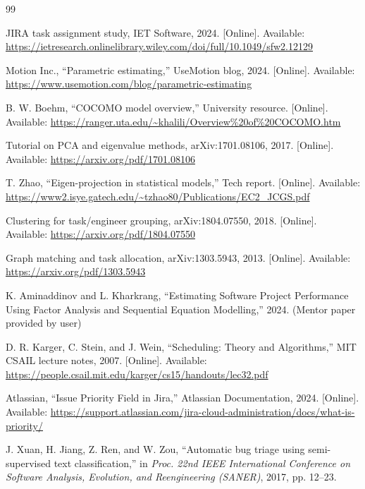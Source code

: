 \documentclass[journal]{IEEEtran}
\begin{document}
\begin{thebibliography}{99}

JIRA task assignment study, IET Software, 2024. [Online]. Available: \url{https://ietresearch.onlinelibrary.wiley.com/doi/full/10.1049/sfw2.12129}

Motion Inc., ``Parametric estimating,'' UseMotion blog, 2024. [Online]. Available: \url{https://www.usemotion.com/blog/parametric-estimating}

B. W. Boehm, ``COCOMO model overview,'' University resource. [Online]. Available: \url{https://ranger.uta.edu/~khalili/Overview%20of%20COCOMO.htm}

Tutorial on PCA and eigenvalue methods, arXiv:1701.08106, 2017. [Online]. Available: \url{https://arxiv.org/pdf/1701.08106}

T. Zhao, ``Eigen-projection in statistical models,'' Tech report. [Online]. Available: \url{https://www2.isye.gatech.edu/~tzhao80/Publications/EC2_JCGS.pdf}

Clustering for task/engineer grouping, arXiv:1804.07550, 2018. [Online]. Available: \url{https://arxiv.org/pdf/1804.07550}

Graph matching and task allocation, arXiv:1303.5943, 2013. [Online]. Available: \url{https://arxiv.org/pdf/1303.5943}

K. Aminaddinov and L. Kharkrang, ``Estimating Software Project Performance Using Factor Analysis and Sequential Equation Modelling,'' 2024. (Mentor paper provided by user)

D. R. Karger, C. Stein, and J. Wein, ``Scheduling: Theory and Algorithms,'' MIT CSAIL lecture notes, 2007. [Online]. Available: \url{https://people.csail.mit.edu/karger/cs15/handouts/lec32.pdf}

Atlassian, ``Issue Priority Field in Jira,'' Atlassian Documentation, 2024. [Online]. Available: \url{https://support.atlassian.com/jira-cloud-administration/docs/what-is-priority/}

J. Xuan, H. Jiang, Z. Ren, and W. Zou, ``Automatic bug triage using semi-supervised text classification,'' in \emph{Proc. 22nd IEEE International Conference on Software Analysis, Evolution, and Reengineering (SANER)}, 2017, pp. 12–23.


\end{thebibliography}
\end{document}

